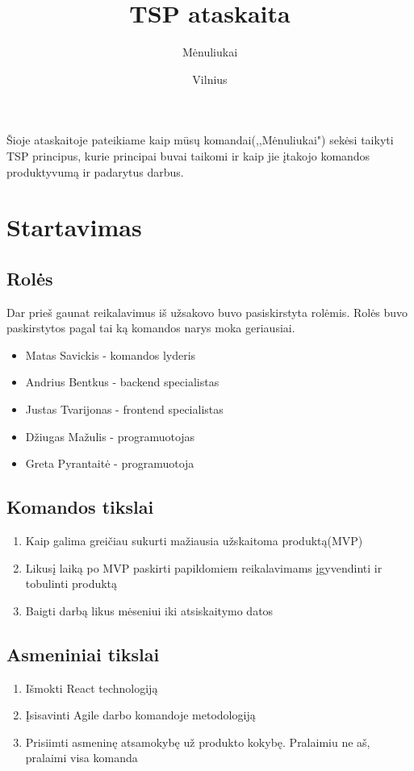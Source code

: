 \documentclass{VUMIFInfKursinis}
\title{TSP ataskaita}
\author{Mėnuliukai}
\date{Vilnius \\ \the\year}
\begin{document}
\maketitle

\tableofcontents

Šioje ataskaitoje pateikiame kaip mūsų komandai(,,Mėnuliukai") sekėsi taikyti TSP principus, kurie principai buvai taikomi ir kaip jie įtakojo komandos produktyvumą ir padarytus darbus.

\section{Startavimas}
	\subsection{Rolės}
		Dar prieš gaunat reikalavimus iš užsakovo buvo pasiskirstyta rolėmis. Rolės buvo paskirstytos pagal tai ką komandos narys moka geriausiai.
		\begin{itemize}
			\item{Matas Savickis - komandos lyderis}
			\item{Andrius Bentkus - backend specialistas}
			\item{Justas Tvarijonas - frontend specialistas}
			\item{Džiugas Mažulis - programuotojas}
			\item{Greta Pyrantaitė - programuotoja}
		\end{itemize}
	\subsection{Komandos tikslai}
		\begin{enumerate}
			\item{Kaip galima greičiau sukurti mažiausia užskaitoma produktą(MVP)}
			\item{Likusį laiką po MVP paskirti papildomiem reikalavimams įgyvendinti ir tobulinti produktą}
			\item{Baigti darbą likus mėseniui iki atsiskaitymo datos}
		\end{enumerate}
	\subsection{Asmeniniai tikslai}
		\begin{enumerate}
			\item{Išmokti React technologiją}
			\item{Įsisavinti Agile darbo komandoje metodologiją}
			\item{Prisiimti asmeninę atsamokybę už produkto kokybę. Pralaimiu ne aš, pralaimi visa komanda}
		\end{enumerate}
\end{document}
